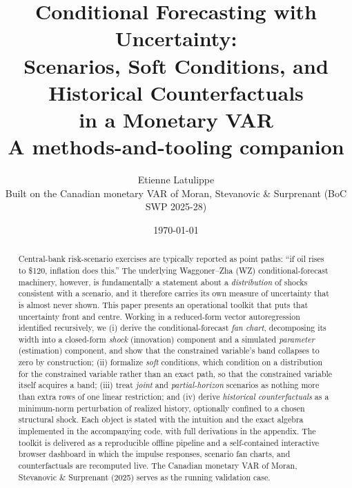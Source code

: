 \documentclass[11pt]{article}
\title{Conditional Forecasting with Uncertainty:\\
Scenarios, Soft Conditions, and Historical Counterfactuals\\
in a Monetary VAR\\[4pt]
\large A methods-and-tooling companion}
\author{%
  Etienne Latulippe\\
  \small Built on the Canadian monetary VAR of Moran, Stevanovic \& Surprenant (BoC SWP 2025-28)}
\date{\today}
\theoremstyle{remark}
\begin{document}
\maketitle

\begin{abstract}
\noindent Central-bank risk-scenario exercises are typically reported as point
paths: ``if oil rises to \$120, inflation does this.'' The underlying
Waggoner--Zha (WZ) conditional-forecast machinery, however, is fundamentally a
statement about a \emph{distribution} of shocks consistent with a scenario, and
it therefore carries its own measure of uncertainty that is almost never shown.
This paper presents an operational toolkit that puts that uncertainty front and
centre. Working in a reduced-form vector autoregression identified recursively,
we (i) derive the conditional-forecast \emph{fan chart}, decomposing its width
into a closed-form \emph{shock} (innovation) component and a simulated
\emph{parameter} (estimation) component, and show that the constrained variable's
band collapses to zero by construction; (ii) formalize \emph{soft} conditions,
which condition on a distribution for the constrained variable rather than an
exact path, so that the constrained variable itself acquires a band; (iii) treat
\emph{joint} and \emph{partial-horizon} scenarios as nothing more than extra rows
of one linear restriction; and (iv) derive \emph{historical counterfactuals} as a
minimum-norm perturbation of realized history, optionally confined to a chosen
structural shock. Each object is stated with the intuition and the exact algebra
implemented in the accompanying code, with full derivations in the appendix. The
toolkit is delivered as a reproducible offline pipeline and a self-contained
interactive browser dashboard in which the impulse responses, scenario fan
charts, and counterfactuals are recomputed live. The Canadian monetary VAR of
Moran, Stevanovic \& Surprenant (2025) serves as the running validation case.
\end{abstract}

\end{document}
